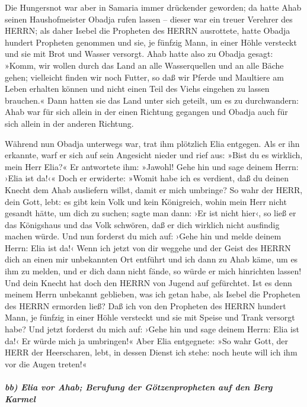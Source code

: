 Die Hungersnot war aber in Samaria immer drückender geworden;
da hatte Ahab seinen Haushofmeister Obadja rufen lassen --
dieser war ein treuer Verehrer des HERRN; als daher Isebel
die Propheten des HERRN ausrottete, hatte Obadja hundert Propheten
genommen und sie, je fünfzig Mann, in einer Höhle versteckt und sie mit
Brot und Wasser versorgt. Ahab hatte also zu Obadja
gesagt: »Komm, wir wollen durch das Land an alle Wasserquellen und an
alle Bäche gehen; vielleicht finden wir noch Futter, so daß wir Pferde
und Maultiere am Leben erhalten können und nicht einen Teil des Viehs
eingehen zu lassen brauchen.« Dann hatten sie das Land
unter sich geteilt, um es zu durchwandern: Ahab war für sich allein in
der einen Richtung gegangen und Obadja auch für sich allein in der
anderen Richtung.

Während nun Obadja unterwegs war, trat ihm plötzlich Elia
entgegen. Als er ihn erkannte, warf er sich auf sein Angesicht nieder
und rief aus: »Bist du es wirklich, mein Herr Elia?« Er
antwortete ihm: »Jawohl! Gehe hin und sage deinem Herrn: ›Elia ist da!‹«
Doch er erwiderte: »Womit habe ich es verdient, daß du
deinen Knecht dem Ahab ausliefern willst, damit er mich umbringe?
So wahr der HERR, dein Gott, lebt: es gibt kein Volk und
kein Königreich, wohin mein Herr nicht gesandt hätte, um dich zu suchen;
sagte man dann: ›Er ist nicht hier‹, so ließ er das Königshaus und das
Volk schwören, daß er dich wirklich nicht ausfindig machen würde.
Und nun forderst du mich auf: ›Gehe hin und melde deinem
Herrn: Elia ist da!‹ Wenn ich jetzt von dir weggehe und
der Geist des HERRN dich an einen mir unbekannten Ort entführt und ich
dann zu Ahab käme, um es ihm zu melden, und er dich dann nicht fände, so
würde er mich hinrichten lassen! Und dein Knecht hat doch den HERRN von
Jugend auf gefürchtet. Ist es denn meinem Herrn unbekannt
geblieben, was ich getan habe, als Isebel die Propheten des HERRN
ermorden ließ? Daß ich von den Propheten des HERRN hundert Mann, je
fünfzig in einer Höhle versteckt und sie mit Speise und Trank versorgt
habe? Und jetzt forderst du mich auf: ›Gehe hin und sage
deinem Herrn: Elia ist da!‹ Er würde mich ja umbringen!«
Aber Elia entgegnete: »So wahr Gott, der HERR der
Heerscharen, lebt, in dessen Dienst ich stehe: noch heute will ich ihm
vor die Augen treten!«

\hypertarget{bb-elia-vor-ahab-berufung-der-guxf6tzenpropheten-auf-den-berg-karmel}{%
\subparagraph{bb) Elia vor Ahab; Berufung der Götzenpropheten auf den
Berg
Karmel}\label{bb-elia-vor-ahab-berufung-der-guxf6tzenpropheten-auf-den-berg-karmel}}

